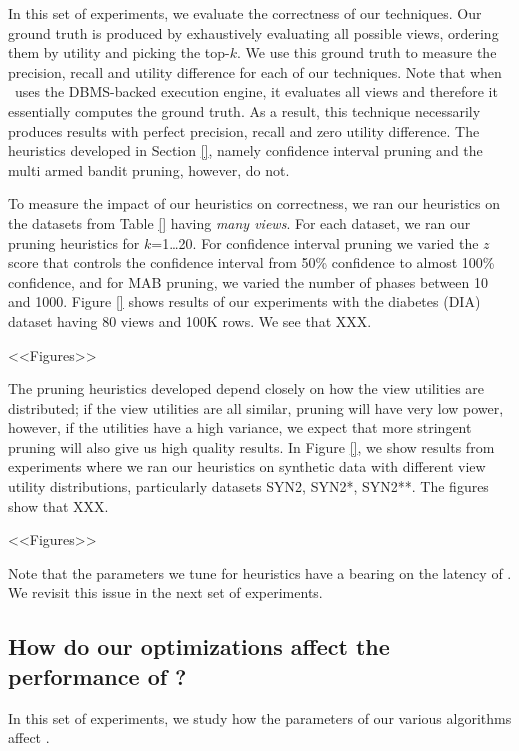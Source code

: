 In this set of experiments, we evaluate the correctness of our techniques.
Our ground truth is produced by exhaustively
evaluating all possible views, ordering them by utility and picking the top-$k$. 
We use this ground truth to measure the precision, recall and
utility difference for each of our techniques.
Note that when \SeeDB\ uses the DBMS-backed execution engine, it
evaluates all views and therefore it essentially computes the ground truth.
As a result, this technique necessarily produces results with perfect precision,
recall and zero utility difference.
The heuristics developed in Section \ref{}, namely
confidence interval pruning and the multi armed bandit pruning, however, do not.

To measure the impact of our heuristics on correctness, we ran our heuristics on
the datasets from Table \ref{} having {\it many views}. 
For each dataset, we ran our pruning heuristics for $k$=1\ldots 20. 
For confidence interval pruning we varied the $z$ score that controls the
confidence interval from 50\% confidence to almost 100\% confidence, and for MAB
pruning, we varied the number of phases between 10 and 1000.
Figure \ref{} shows results of our experiments with the diabetes (DIA) dataset
having 80 views and 100K rows. We see that XXX.


<<Figures>>

The pruning heuristics developed depend closely on how the view utilities are
distributed; if the view utilities are all similar, pruning will have very low
power, however, if the utilities have a high variance, we expect that more
stringent pruning will also give us high quality results.
In Figure \ref{}, we show results from experiments where we ran our heuristics
on synthetic data with different view utility distributions, particularly
datasets SYN2, SYN2*, SYN2**. The figures show that XXX.

<<Figures>>

Note that the parameters we tune for heuristics have a bearing on the latency of
\SeeDB. We revisit this issue in the next set of experiments.


\subsection{How do our optimizations affect the performance of
\SeeDB?}
\label{sec:expt_accuracy}

In this set of experiments, we study how the parameters of our various
algorithms affect \SeeDB. 

